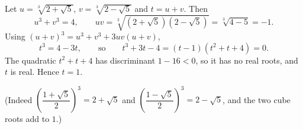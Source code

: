 Let $u=\sqrt[3]{2+\sqrt5}$, $v=\sqrt[3]{2-\sqrt5}$ and $t=u+v$. Then
\[
u^3+v^3=4,\qquad uv=\sqrt[3]{(2+\sqrt5)(2-\sqrt5)}=\sqrt[3]{4-5}=-1 .
\]
Using $(u+v)^3=u^3+v^3+3uv(u+v)$,
\[
t^3=4-3t,\qquad\text{so}\qquad t^3+3t-4=(t-1)(t^2+t+4)=0 .
\]
The quadratic $t^2+t+4$ has discriminant $1-16<0$, so it has no real roots, and $t$ is real. Hence $t=\boxed{1}$.

(Indeed $\left(\dfrac{1+\sqrt5}{2}\right)^3=2+\sqrt5$ and $\left(\dfrac{1-\sqrt5}{2}\right)^3=2-\sqrt5$, and the two cube roots add to $1$.)
